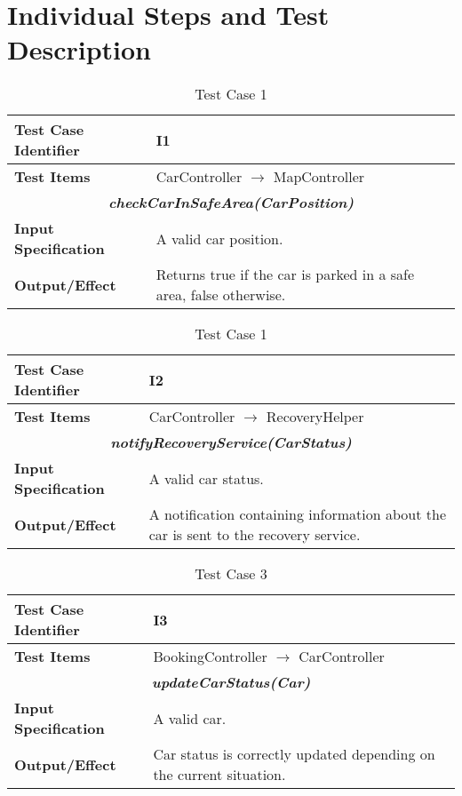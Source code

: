 
\chapter{Individual Steps and Test Description}
\blindtext

\begin{table}[h]
	\begin{tabularx}{\textwidth}{l X}
		\hline
		\textbf{Test Case Identifier}	&	I1\\	\hline
		\textbf{Test Items}			&	CarController $\rightarrow$ MapController \\	\hline\hline
		\multicolumn{2}{c}{\textbf{\textit{checkCarInSafeArea(CarPosition)}}}	\\	\hline
			\textbf{Input Specification}	&	A valid car position.\\	\hline
			\textbf{Output/Effect}	&	Returns true if the car is parked in a safe area, false otherwise.\\	\hline
	\end{tabularx}
	\captionsetup{textformat=empty,labelformat=blank}
	\caption{Test Case 1}
	\label{table:template-table-1}
\end{table}

\begin{table}[h]
	\begin{tabularx}{\textwidth}{l X}
		\hline
		\textbf{Test Case Identifier}	&	I2\\	\hline
		\textbf{Test Items}			&	CarController $\rightarrow$ RecoveryHelper \\	\hline\hline
		\multicolumn{2}{c}{\textbf{\textit{notifyRecoveryService(CarStatus)}}}	\\	\hline
			\textbf{Input Specification}	&	A valid car status.\\	\hline
			\textbf{Output/Effect}	&	A notification containing information about the car is sent to the recovery service.\\	\hline
	\end{tabularx}
	\captionsetup{textformat=empty,labelformat=blank}
	\caption{Test Case 1}
	\label{table:template-table-2}
\end{table}

\begin{table}[h]
	\begin{tabularx}{\textwidth}{l X}
		\hline
		\textbf{Test Case Identifier}	&	I3\\	\hline
		\textbf{Test Items}			&	BookingController $\rightarrow$ CarController \\	\hline\hline
		\multicolumn{2}{c}{\textbf{\textit{updateCarStatus(Car)}}}	\\	\hline
			\textbf{Input Specification}	&	A valid car.\\	\hline
			\textbf{Output/Effect}	&	Car status is correctly updated depending on the current situation.\\	\hline
	\end{tabularx}
	\captionsetup{textformat=empty,labelformat=blank}
	\caption{Test Case 3}
	\label{table:template-table-3}
\end{table}

